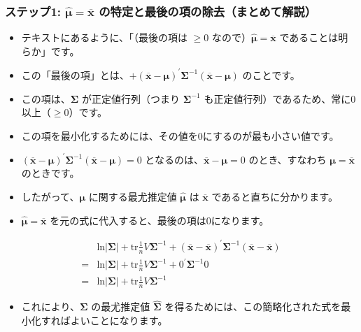 \documentclass[aspectratio=169]{beamer}
\begin{document}
\begin{frame}[t]
\frametitle{ステップ1: $\hat{\bm{\mu}}=\overline{\bm{x}}$ の特定と最後の項の除去（まとめて解説）}
\small
\begin{itemize}
    \item テキストにあるように、「（最後の項は $\ge0$ なので）$\hat{\bm{\mu}}=\overline{\bm{x}}$ であることは明らか」です。
    \item この「最後の項」とは、$+(\overline{\bm{x}}-\bm{\mu})^{\prime}\bm{\Sigma}^{-1}(\overline{\bm{x}}-\bm{\mu})$ のことです。
    \item この項は、$\bm{\Sigma}$ が正定値行列（つまり $\bm{\Sigma}^{-1}$ も正定値行列）であるため、常に0以上（$\ge0$）です。
    \item この項を最小化するためには、その値を0にするのが最も小さい値です。
    \item $(\overline{\bm{x}}-\bm{\mu})^{\prime}\bm{\Sigma}^{-1}(\overline{\bm{x}}-\bm{\mu})=0$ となるのは、$\overline{\bm{x}}-\bm{\mu}=0$ のとき、すなわち $\bm{\mu}=\overline{\bm{x}}$ のときです。
    \item したがって、$\bm{\mu}$ に関する最尤推定値 $\hat{\bm{\mu}}$ は $\overline{\bm{x}}$ であると直ちに分かります。
    \item $\hat{\bm{\mu}}=\overline{\bm{x}}$ を元の式に代入すると、最後の項は0になります。
\end{itemize}
\begin{align*}
&\text{ln}|\bm{\Sigma}|+\text{tr}\frac{1}{n}V\bm{\Sigma}^{-1}+(\overline{\bm{x}}-\overline{\bm{x}})^{\prime}\bm{\Sigma}^{-1}(\overline{\bm{x}}-\overline{\bm{x}}) \\
=&\text{ln}|\bm{\Sigma}|+\text{tr}\frac{1}{n}V\bm{\Sigma}^{-1}+0^{\prime}\bm{\Sigma}^{-1}0 \\
=&\text{ln}|\bm{\Sigma}|+\text{tr}\frac{1}{n}V\bm{\Sigma}^{-1}
\end{align*}
\begin{itemize}
    \item これにより、$\bm{\Sigma}$ の最尤推定値 $\hat{\bm{\Sigma}}$ を得るためには、この簡略化された式を最小化すればよいことになります。
\end{itemize}
\end{frame}
\end{document}
